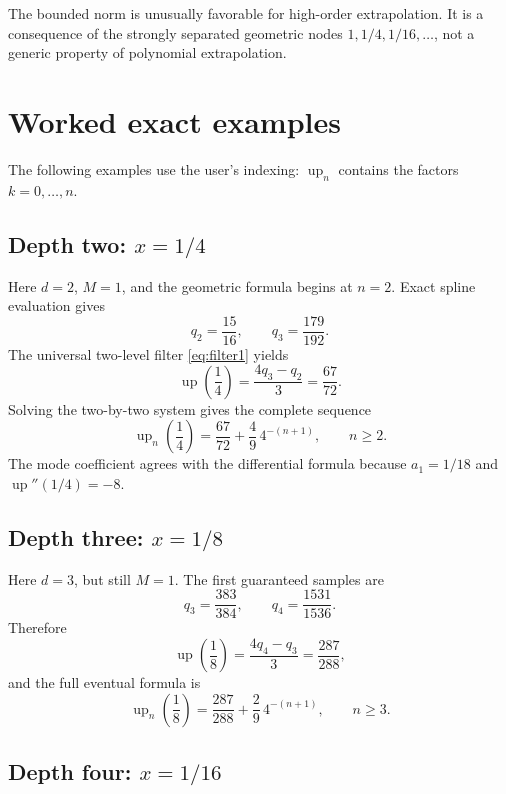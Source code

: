 \documentclass[11pt]{article}
\newcommand{\upf}{\operatorname{up}}
\begin{document}
The bounded norm is unusually favorable for high-order extrapolation.  It is a
consequence of the strongly separated geometric nodes \(1,1/4,1/16,\ldots\),
not a generic property of polynomial extrapolation.

\section{Worked exact examples}

The following examples use the user's indexing: \(\upf_n\) contains the
factors \(k=0,\ldots,n\).

\subsection{Depth two: \(x=1/4\)}

Here \(d=2\), \(M=1\), and the geometric formula begins at \(n=2\).  Exact
spline evaluation gives
\[
 q_2=\frac{15}{16},
 \qquad
 q_3=\frac{179}{192}.
\]
The universal two-level filter \cref{eq:filter1} yields
\[
 \upf\!\left(\frac14\right)
 =\frac{4q_3-q_2}{3}
 =\frac{67}{72}.
\]
Solving the two-by-two system gives the complete sequence
\begin{equation}\label{eq:example-quarter}
 \boxed{\displaystyle
 \upf_n\!\left(\frac14\right)
 =\frac{67}{72}+\frac49\,4^{-(n+1)},
 \qquad n\ge2.}
\end{equation}
The mode coefficient agrees with the differential formula because
\(a_1=1/18\) and \(\upf''(1/4)=-8\).

\subsection{Depth three: \(x=1/8\)}

Here \(d=3\), but still \(M=1\).  The first guaranteed samples are
\[
 q_3=\frac{383}{384},
 \qquad
 q_4=\frac{1531}{1536}.
\]
Therefore
\[
 \upf\!\left(\frac18\right)
 =\frac{4q_4-q_3}{3}
 =\frac{287}{288},
\]
and the full eventual formula is
\begin{equation}\label{eq:example-eighth}
 \boxed{\displaystyle
 \upf_n\!\left(\frac18\right)
 =\frac{287}{288}+\frac29\,4^{-(n+1)},
 \qquad n\ge3.}
\end{equation}

\subsection{Depth four: \(x=1/16\)}
\end{document}
